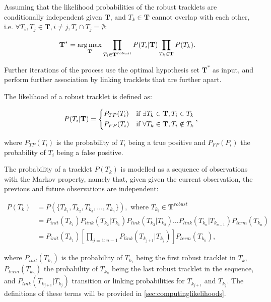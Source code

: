 		Assuming that the likelihood probabilities of the robust tracklets are conditionally independent given $\textbf{T}$, and $ T_k \in \textbf{T}$  cannot overlap with each other, i.e. $ \forall T_i, T_j \in \textbf{T}, i \neq j,  T_i \cap T_j = \emptyset $:
				
		\begin{align*}
			\textbf{T}^* &= \operatorname*{arg\,max}_{\textbf{T}}   \prod_{T_i \in \textbf{T}^{robust}} P(T_i | \textbf{T}) \prod_{T_k \in \textbf{T}} P(T_k) \text{.}
		\end{align*}
		
		Further iterations of the process use the optimal hypothesis set $\textbf{T}^*$ as input, and perform further association by linking tracklets that are further apart. 
		
		The likelihood of a robust tracklet is defined as:
		
		\[
			P(T_i | \textbf{T}) = \begin{dcases}
						   P_{TP}(T_i) & \text{if } \exists T_k \in \textbf{T}, T_i \in T_k \\
						   P_{FP}(T_i) & \text{if } \forall T_k \in \textbf{T}, T_i \notin T_k
						\end{dcases} \text{,}
		\]
  	 	
  	 	\noindent where $ P_{TP}(T_i) $ is the probability of $T_i$ being a true positive and $P_{FP}(P_i) $ the probability of $T_i$ being a false positive.
  	 	
  	 	The probability of a tracklet $P(T_k)$ is modelled as a sequence of observations with the Markov property, namely that, given given the current observation, the previous and future observations are independent:
  	 	
  	 	\begin{align*}
  	 		P(T_k) &= P(\{T_{k_1}, T_{k_2}, T_{k_3}, \dots, T_{k_n}\}), \text{ where } T_{k_i} \in \textbf{T}^{robust} \\
  	 			&= P_{init}(T_{k_1}) P_{link}(T_{k_2}|T_{k_1}) P_{link}(T_{k_3}|T_{k_2}) \dots P_{link}(T_{k_n}|T_{k_{n-1}}) P_{term}(T_{k_n}) \\
  	 			&= P_{init}(T_{k_1}) \left[ \prod_{j=1:{n-1}} P_{link}(T_{k_{j+1}}|T_{k_j}) \right] P_{term}(T_{k_n}) \text{,}
  	 	\end{align*}
  	 	
  	 	\noindent where $P_{init}(T_{k_1})$ is the probability of $T_{k_1}$ being the first robust tracklet in $T_k$, $P_{term}(T_{k_n})$ the probability of $T_{k_n}$ being the last robust tracklet in the sequence, and $P_{link}(T_{k_{j+1}}|T_{k_j})$ transition or linking probabilities for $T_{k_{j+1}}$ and $T_{k_{j}}$. The definitions of these terms will be provided in \cref{sec:computinglikelihoods}.
  	 	
